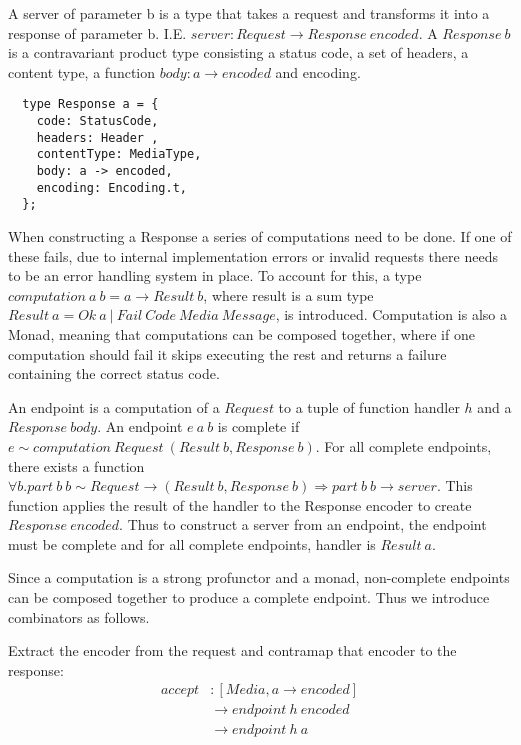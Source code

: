 A server of parameter b is a type that takes a request and transforms it into a
response of parameter b. I.E.  $server : Request\rightarrow Response\ encoded$.
A $Response\ b$ is a contravariant product type consisting a status code, a set
of headers, a content type, a function $body: a\rightarrow encoded$ and
encoding.

\begin{lstlisting}
  type Response a = {
    code: StatusCode,
    headers: Header ,
    contentType: MediaType,
    body: a -> encoded,
    encoding: Encoding.t,
  };
\end{lstlisting}

When constructing a Response a series of computations need to be done. If one of
these fails, due to internal implementation errors or invalid requests there
needs to be an error handling system in place. To account for this, a type
$computation\ a\ b = a \rightarrow Result\ b$, where result is a sum type
$Result\ a = Ok\ a\ |\ Fail\ Code\ Media\ Message$, is introduced. Computation
is also a Monad, meaning that computations can be composed together, where if
one computation should fail it skips executing the rest and returns a failure
containing the correct status code. 


An endpoint is a computation of a $Request$ to a tuple of function handler $h$
and a $Response\ body$. An endpoint $e\ a\ b$ is complete if $e\sim computation\
Request\ (Result\ b, Response\ b)$. For all complete endpoints, there exists a
function $\forall b. part\ b \ b\sim Request \rightarrow (Result\ b, Response\
b)\Rightarrow part\ b\ b \rightarrow server$. This function applies the result
of the handler to the Response encoder to create $Response\ encoded$. Thus to
construct a server from an endpoint, the endpoint must be complete and for all
complete endpoints, handler is $Result\ a$.

Since a computation is a strong profunctor and a monad, non-complete endpoints
can be composed together to produce a complete endpoint. Thus we introduce
combinators as follows.

Extract the encoder from the request and contramap that encoder to the
response: 
\begin{equation}
\begin{split}
    accept & : [Media,a\rightarrow encoded] \\
           & \rightarrow endpoint\ h\ encoded \\ 
           & \rightarrow endpoint\ h\ a \\
\end{split}
\end{equation}

